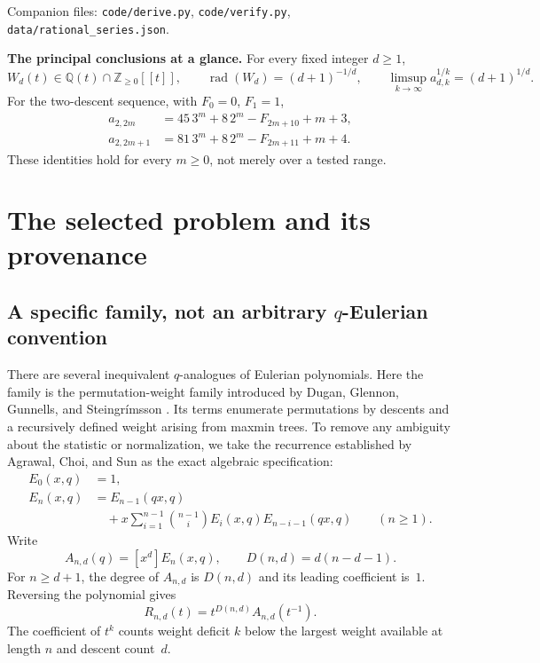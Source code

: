 \documentclass[11pt,letterpaper]{article}
\numberwithin{equation}{section}
\theoremstyle{definition}
\theoremstyle{remark}
\newcommand{\Q}{\mathbb Q}
\newcommand{\Z}{\mathbb Z}
\begin{document}
\vspace{3pt}
\begin{center}
\small\sffamily
Companion files: \texttt{code/derive.py}, \texttt{code/verify.py},
\texttt{data/rational\_series.json}.
\end{center}

\newpage
\begingroup
\small
\setlength{\parskip}{0pt}
\tableofcontents
\endgroup
\vspace{4pt}
\begin{resultbox}[breakable=false]
\textbf{The principal conclusions at a glance.}
For every fixed integer $d\ge1$,
\[
 W_d(t)\in\Q(t)\cap\Z_{\ge0}[[t]],\qquad
 \operatorname{rad}(W_d)=(d+1)^{-1/d},\qquad
 \limsup_{k\to\infty}a_{d,k}^{1/k}=(d+1)^{1/d}.
\]
For the two-descent sequence, with $F_0=0$, $F_1=1$,
\begin{align*}
 a_{2,2m}&=45\,3^m+8\,2^m-F_{2m+10}+m+3,\\
 a_{2,2m+1}&=81\,3^m+8\,2^m-F_{2m+11}+m+4.
\end{align*}
These identities hold for every $m\ge0$, not merely over a tested range.
\end{resultbox}
\clearpage

\section{The selected problem and its provenance}
\subsection{A specific family, not an arbitrary \texorpdfstring{$q$}{q}-Eulerian convention}
There are several inequivalent $q$-analogues of Eulerian polynomials.
Here the family is the permutation-weight family introduced by
Dugan, Glennon, Gunnells, and Steingr\'imsson \cite{DGGs}.
Its terms enumerate permutations by descents and a recursively defined
weight arising from maxmin trees. To remove any ambiguity about the
statistic or normalization, we take the recurrence established by
Agrawal, Choi, and Sun \cite[Theorem 4.1]{ACS} as the exact algebraic
specification:
\begin{equation}\label{eq:original}
\begin{split}
 E_0(x,q)&=1,\\
 E_n(x,q)&=E_{n-1}(qx,q)\\
 &\quad+x\sum_{i=1}^{n-1}\binom{n-1}{i}
              E_i(x,q)E_{n-i-1}(qx,q)\qquad(n\ge1).
\end{split}
\end{equation}
Write
\begin{equation}\label{eq:Adefinition}
 A_{n,d}(q)=[x^d]E_n(x,q),\qquad D(n,d)=d(n-d-1).
\end{equation}
For $n\ge d+1$, the degree of $A_{n,d}$ is $D(n,d)$ and its
leading coefficient is~$1$. Reversing the polynomial gives
\begin{equation}\label{eq:Rdefinition}
 R_{n,d}(t)=t^{D(n,d)}A_{n,d}(t^{-1}).
\end{equation}
The coefficient of $t^k$ counts weight deficit $k$ below the largest weight
available at length $n$ and descent count~$d$.
\end{document}
